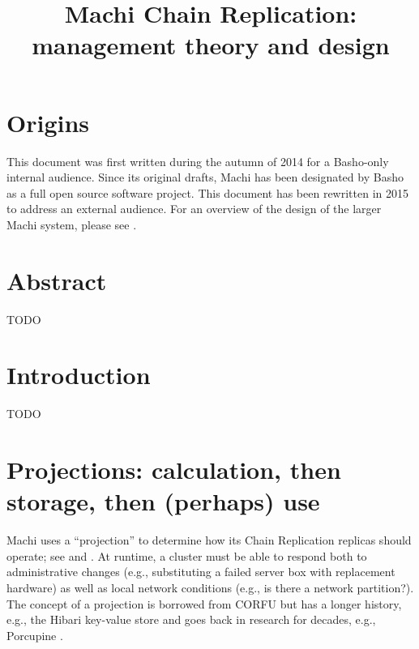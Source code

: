 \documentclass[preprint,10pt]{sigplanconf}
\begin{document}

\conferenceinfo{}{} 


\title{Machi Chain Replication: management theory and design}
\subtitle{}


\maketitle

\section{Origins}
\label{sec:origins}

This document was first written during the autumn of 2014 for a
Basho-only internal audience.  Since its original drafts, Machi has
been designated by Basho as a full open source software project.  This
document has been rewritten in 2015 to address an external audience.
For an overview of the design of the larger Machi system, please see
\cite{machi-design}.

\section{Abstract}
\label{sec:abstract}

TODO

\section{Introduction}
\label{sec:introduction}

TODO

\section{Projections: calculation, then storage, then (perhaps) use}
\label{sec:projections}

Machi uses a ``projection'' to determine how its Chain Replication replicas
should operate; see \cite{machi-design} and
\cite{corfu1}.  At runtime, a cluster must be able to respond both to
administrative changes (e.g., substituting a failed server box with
replacement hardware) as well as local network conditions (e.g., is
there a network partition?).  The concept of a projection is borrowed
from CORFU but has a longer history, e.g., the Hibari key-value store
\cite{cr-theory-and-practice} and goes back in research for decades,
e.g., Porcupine \cite{porcupine}.
\end{document}
